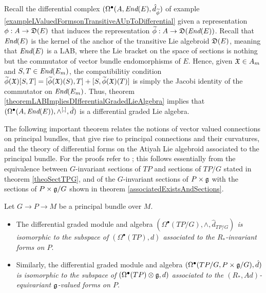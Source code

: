 \begin{example}\label{exampleOmegaAEndEIsDifferentialGradedLieAlgebra}
Recall the differential complex $(\Omega^\bullet(A, \End(E), \hat d_{\tilde \phi})$ of example \ref{exampleLValuedFormsonTransitiveAUpToDifferential} given a representation $\phi: A \to \alg D(E)$ that induces the representation $\tilde \phi:A \to \alg D(\End(E))$. Recall that $\operatorname{\textit{End}}(E)$ is the kernel of the anchor of the transitive Lie algebroid $\mathfrak{D}(E)$, meaning that $\operatorname{\textit{End}}(E)$ is a LAB, where the Lie bracket on the space of sections is nothing but the commutator of vector bundle endomorphisms of $E$. Hence, given $\mathfrak{X} \in A_m$ and $S, T \in \operatorname{\textit{End}}(E_m)$, the compatibilitiy condition $\tilde \phi(\oid X)[S, T] = [\tilde \phi(\oid X)(S), T] + [S, \tilde \phi(\oid X)(T)]$ is simply the Jacobi identity of the commutator on $\operatorname{\textit{End}}(E_m)$. Thus, theorem \ref{theoremLABImpliesDIfferentialGradedLieAlgebra} implies that $(\Omega^\bullet(A, \operatorname{\textit{End}}(E)), \wedge^{[,]}, \hat d)$ is a differential graded Lie algebra.
\end{example}

\linea

The following important theorem relates the notions of vector valued connections on principal bundles, that give rise to principal connections and their curvatures, and the theory of differential forms on the Atiyah Lie algebroid associated to the principal bundle. For the proofs refer to \cite{Mackenzie2005}; this follows essentially from the equivalence between $G$-invariant sections of $TP$ and sections of $TP/G$ stated in theorem \ref{theoSectTPG}, and of the $G$-invariant sections of $P \times \mathfrak{g}$ with the sections of $P \times \mathfrak{g}/G$ shown in theorem \ref{associatedExistsAndSections}.

\begin{theorem}\label{theoFormsPrincipalAtiyahSameGInvariantEquivariantSubspaces}
Let $G \to P \to M$ be a principal bundle over $M$. 
\begin{itemize}
    \item The differential graded module and algebra \textit{$(\Omega^\bullet(TP/G), \wedge, \hat d_{TP/G})$ is isomorphic to the subspace of $(\Omega^\bullet(TP), d)$ associated to the $R_*$-invariant  forms on $P$}.
    
    \item Similarly, the differential graded module and algebra \textit{$(\Omega^\bullet(TP/G, P \times \mathfrak{g}/G), \hat d)$ is isomorphic to the subspace of $(\Omega^\bullet(TP) \otimes \mathfrak{g}, d)$ associated to the $(R_*, Ad)$-equivariant $\mathfrak{g}$-valued forms on $P$}.
\end{itemize} 
\end{theorem}


